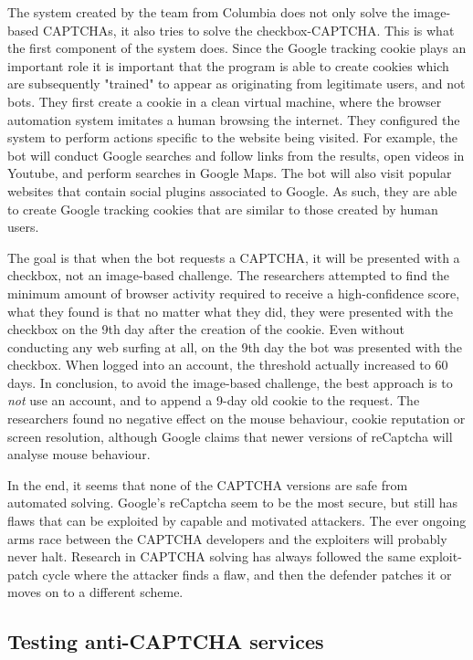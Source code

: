 \documentclass[a4paper]{IEEEtran}
\begin{document}
The system created by the team from Columbia does not only solve the image-based CAPTCHAs, it also tries to solve the checkbox-CAPTCHA. This is what the first component of the system does. Since the Google tracking cookie plays an important role it is important that the program is able to create cookies which are subsequently "trained" to appear as originating from legitimate users, and not bots. They first create a cookie in a clean virtual machine, where the browser automation system imitates a human browsing the internet. They configured the system to perform actions specific to the website being visited. For example, the bot will conduct Google searches and follow links from the results, open videos in Youtube, and perform searches in Google Maps. The bot will also visit popular websites that contain social plugins associated to Google. As such, they are able to create Google tracking cookies that are similar to those created by human users.

The goal is that when the bot requests a CAPTCHA, it will be presented with a checkbox, not an image-based challenge. The researchers attempted to find the minimum amount of browser activity required to receive a high-confidence score, what they found is that no matter what they did, they were presented with the checkbox on the 9th day after the creation of the cookie. Even without conducting any web surfing at all, on the 9th day the bot was presented with the checkbox. When logged into an account, the threshold actually increased to 60 days. In conclusion, to avoid the image-based challenge, the best approach is to \textit{not} use an account, and to append a 9-day old cookie to the request. The researchers found no negative effect on the mouse behaviour, cookie reputation or screen resolution, although Google claims that newer versions of reCaptcha will analyse mouse behaviour. 

In the end, it seems that none of the CAPTCHA versions are safe from automated solving. Google's reCaptcha seem to be the most secure, but still has flaws that can be exploited by capable and motivated attackers. The ever ongoing arms race between the CAPTCHA developers and the exploiters will probably never halt. Research in CAPTCHA solving has always followed the same exploit-patch cycle where the attacker finds a flaw, and then the defender patches it or moves on to a different scheme.

\subsection{Testing anti-CAPTCHA services}
\end{document}

